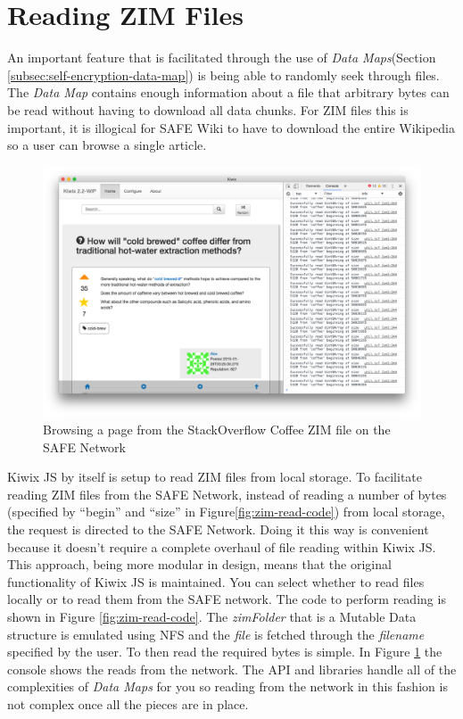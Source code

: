 \section{Reading ZIM Files}
 
An important feature that is facilitated through the use of \textit{Data Maps}(Section \ref{subsec:self-encryption-data-map}) is being able to randomly seek through files. The \textit{Data Map} contains enough information about a file that arbitrary bytes can be read without having to download all data chunks. For ZIM files this is important, it is illogical for SAFE Wiki to have to download the entire Wikipedia so a user can browse a single article.

\begin{figure}[h]
	\begin{center}
		\includegraphics[width=\textwidth]{images/safe-wiki-browsing-coffee}
		\caption{Browsing a page from the StackOverflow Coffee ZIM file on the SAFE Network}
		\label{fig:browsing-coffee}
	\end{center}
\end{figure}

Kiwix JS by itself is setup to read ZIM files from local storage. To facilitate reading ZIM files from the SAFE Network, instead of reading a number of bytes (specified by ``begin'' and ``size'' in Figure\ref{fig:zim-read-code}) from local storage, the request is directed to the SAFE Network. Doing it this way is convenient because it doesn't require a complete overhaul of file reading within Kiwix JS. This approach, being more modular in design, means that the original functionality of Kiwix JS is maintained. You can select whether to read files locally or to read them from the SAFE network. The code to perform reading is shown in Figure \ref{fig:zim-read-code}. The \textit{zimFolder} that is a Mutable Data structure is emulated using NFS and the \textit{file} is fetched through the \textit{filename} specified by the user. To then read the required bytes is simple. In Figure \ref{fig:browsing-coffee} the console shows the reads from the network. The API and libraries handle all of the complexities of \textit{Data Maps} for you so reading from the network in this fashion is not complex once all the pieces are in place.

